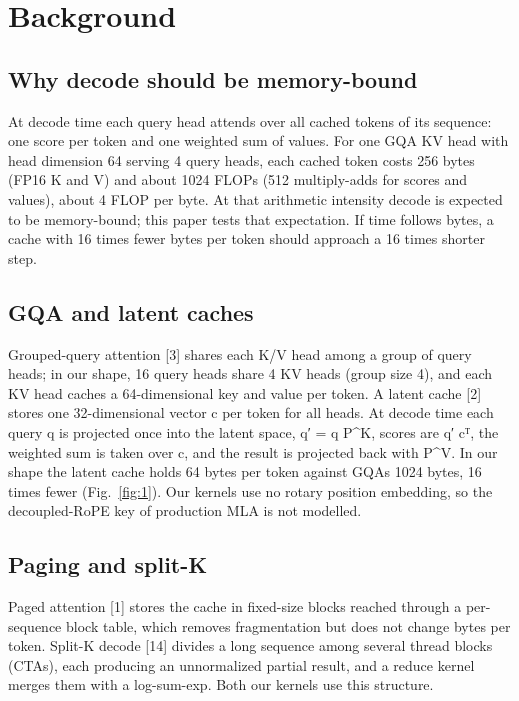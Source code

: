 \documentclass[conference]{IEEEtran}
\begin{document}
\section{Background}\label{sec:2}

\subsection{Why decode should be memory-bound}

At decode time each query head attends over all cached tokens of its sequence: one score per token and one weighted sum of values. For one GQA KV head with head dimension 64 serving 4 query heads, each cached token costs 256 bytes (FP16 K and V) and about 1024 FLOPs (512 multiply-adds for scores and values), about 4 FLOP per byte. At that arithmetic intensity decode is expected to be memory-bound; this paper tests that expectation. If time follows bytes, a cache with 16 times fewer bytes per token should approach a 16 times shorter step.

\subsection{GQA and latent caches}

Grouped-query attention {[}3{]} shares each K/V head among a group of query heads; in our shape, 16 query heads share 4 KV heads (group size 4), and each KV head caches a 64-dimensional key and value per token. A latent cache {[}2{]} stores one 32-dimensional vector c per token for all heads. At decode time each query q is projected once into the latent space, q′ = q P\^{}K, scores are q′ cᵀ, the weighted sum is taken over c, and the result is projected back with P\^{}V. In our shape the latent cache holds 64 bytes per token against GQA\textquotesingle s 1024 bytes, 16 times fewer (Fig.~\ref{fig:1}). Our kernels use no rotary position embedding, so the decoupled-RoPE key of production MLA is not modelled.

\subsection{Paging and split-K}

Paged attention {[}1{]} stores the cache in fixed-size blocks reached through a per-sequence block table, which removes fragmentation but does not change bytes per token. Split-K decode {[}14{]} divides a long sequence among several thread blocks (CTAs), each producing an unnormalized partial result, and a reduce kernel merges them with a log-sum-exp. Both our kernels use this structure.
\end{document}
